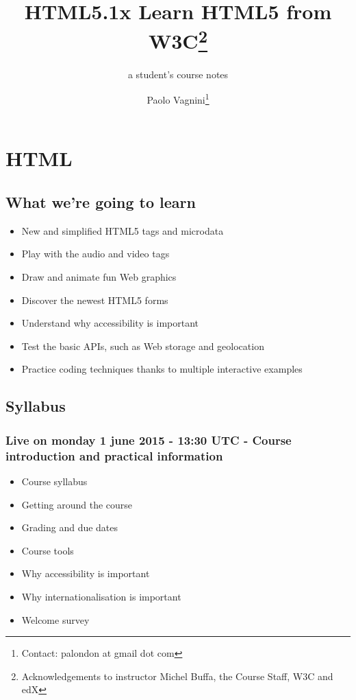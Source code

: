 \documentclass[a4paper,11pt]{book}
\title{HTML5.1x Learn HTML5 from W3C\thanks{Acknowledgements to
instructor Michel Buffa, the Course Staff, W3C and edX}}
\subtitle{a student's course notes}
\author{Paolo Vagnini\thanks{Contact: palondon at gmail dot com}}
\begin{document}
\maketitle
\tableofcontents

\part{HTML}

\chapter{What we're going to learn}
\begin{itemize}
    \item New and simplified HTML5 tags and microdata
    \item Play with the audio and video tags
    \item Draw and animate fun Web graphics
    \item Discover the newest HTML5 forms
    \item Understand why accessibility is important
    \item Test the basic APIs, such as Web storage and geolocation
    \item Practice coding techniques thanks to multiple interactive examples
\end{itemize}

\chapter{Syllabus}

\section{Live on monday 1 june 2015 - 13:30 UTC - Course introduction and practical information}
\begin{itemize}
    \item Course syllabus
    \item Getting around the course
    \item Grading and due dates
    \item Course tools
    \item Why accessibility is important
    \item Why internationalisation is important
    \item Welcome survey
\end{itemize}
\end{document}
